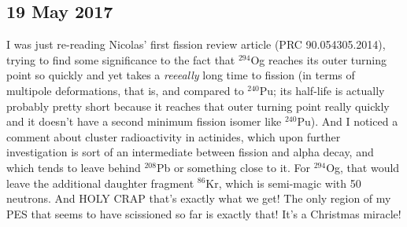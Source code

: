 \documentclass[]{report}
\begin{document}
\subsection*{19 May 2017}

I was just re-reading Nicolas' first fission review article (PRC 90.054305.2014), trying to find some significance to the fact that $^{294}$Og reaches its outer turning point so quickly and yet takes a \textit{reeeally} long time to fission (in terms of multipole deformations, that is, and compared to $^{240}$Pu; its half-life is actually probably pretty short because it reaches that outer turning point really quickly and it doesn't have a second minimum fission isomer like $^{240}$Pu). And I noticed a comment about cluster radioactivity in actinides, which upon further investigation is sort of an intermediate between fission and alpha decay, and which tends to leave behind $^{208}$Pb or something close to it. For $^{294}$Og, that would leave the additional daughter fragment $^{86}$Kr, which is semi-magic with 50 neutrons. And HOLY CRAP that's exactly what we get! The only region of my PES that seems to have scissioned so far  is exactly that! It's a Christmas miracle!
\end{document}
